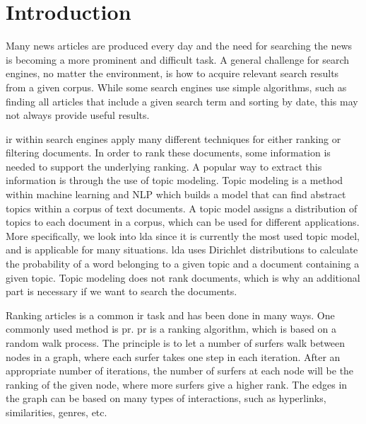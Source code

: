 \section{Introduction}\label{sec:intro}


Many news articles are produced every day and the need for searching the news is becoming a more prominent and difficult task.
A general challenge for search engines, no matter the environment, is how to acquire relevant search results from a given corpus. 
While some search engines use simple algorithms, such as finding all articles that include a given search term and sorting by date, this may not always provide useful results.

\gls{ir} within search engines apply many different techniques for either ranking or filtering documents\cite{google_pagerank2006}.
In order to rank these documents, some information is needed to support the underlying ranking.
A popular way to extract this information is through the use of topic modeling.
Topic modeling is a method within machine learning and \gls{NLP} which builds a model that can find abstract topics within a corpus of text documents.
A topic model assigns a distribution of topics to each document in a corpus, which can be used for different applications.
More specifically, we look into \gls{lda} since it is currently the most used topic model, and is applicable for many situations\cite{lda}.
\gls{lda} uses Dirichlet distributions to calculate the probability of a word belonging to a given topic and a document containing a given topic.
Topic modeling does not rank documents, which is why an additional part is necessary if we want to search the documents.

Ranking articles is a common \gls{ir} task and has been done in many ways.
One commonly used method is \gls{pr}\cite{google_pagerank2006}\cite{pagerank_1999}.
\gls{pr} is a ranking algorithm, which is based on a random walk process.
The principle is to let a number of surfers walk between nodes in a graph, where each surfer takes one step in each iteration.
After an appropriate number of iterations, the number of surfers at each node will be the ranking of the given node, where more surfers give a higher rank.
The edges in the graph can be based on many types of interactions, such as hyperlinks, similarities, genres, etc.

